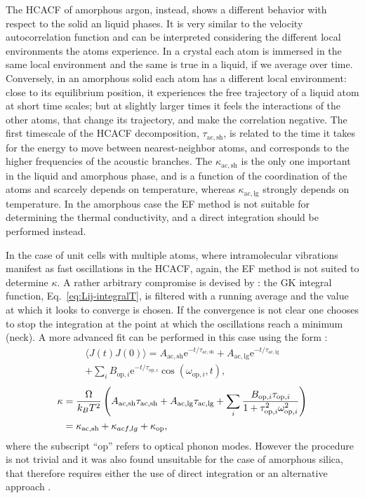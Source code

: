 \begin{LEtext}
The HCACF of amorphous argon, instead, shows a different behavior with respect to the solid an liquid phases. It is very similar to the velocity autocorrelation function and can be interpreted considering the different local environments the atoms experience. In a crystal each atom is immersed in the same local environment and the same is true in a liquid, if we average over time. Conversely, in an amorphous solid each atom has a different local environment: close to its equilibrium position, it experiences the free trajectory of a liquid atom at short time scales; but at slightly larger times it feels the interactions of the other atoms, that change its trajectory, and make the correlation negative. 
The first timescale of the HCACF decomposition, $\tau_{\mathrm{ac,sh}}$, is related to the time it takes for the energy to move between nearest-neighbor atoms, and corresponds to the higher frequencies of the acoustic branches. The $\kappa_{\mathrm{ac,sh}}$ is the only one important in the liquid and amorphous phase, and is a function of the coordination of the atoms and scarcely depends on temperature, whereas $\kappa_{\mathrm{ac,lg}}$ strongly depends on temperature.
In the amorphous case the EF method is not suitable for determining the thermal conductivity, and a direct integration should be performed instead. 

In the case of unit cells with multiple atoms, where intramolecular vibrations manifest as fast oscillations in the HCACF, again, the EF method is not suited to determine $\kappa$. A rather arbitrary compromise is devised by \citet{McGaughey2004b}: the GK integral function, Eq.~\eqref{eq:Lij-integralT}, is filtered with a running average \cite{MovingAverage} and the value at which it looks to converge is chosen. If the convergence is not clear one chooses to stop the integration at the point at which the oscillations reach a minimum (neck). A more advanced fit can be performed in this case using the form \cite{McGaughey2004b}:
\begin{multline}
    \langle J(t) J(0) \rangle = A_{\mathrm{ac,sh}} \mathrm{e}^{-t/\tau_{\mathrm{ac,sh}}} + A_{\mathrm{ac,lg}} \mathrm{e}^{-t/\tau_{\mathrm{ac,lg}}} \\
        + \sum_i B_{\mathrm{op},i} \mathrm{e}^{-t/\tau_{\mathrm{op},i}} \cos(\omega_{\mathrm{op},i},t),
\end{multline}
\begin{equation}
    \begin{aligned}
        \kappa &= \frac{{\mathrm\Omega}}{k_B T^2} \left(A_{\mathrm{ac,sh}}\tau_{\mathrm{ac,sh}} + A_{\mathrm{ac,lg}}\tau_{\mathrm{ac,lg}} + \sum_i \frac{B_{\mathrm{op},i}\tau_{\mathrm{op},i}}{1+\tau_{\mathrm{op},i}^2\omega_{\mathrm{op},i}^2}\right) \\
        &= \kappa_{\mathrm{ac,sh}} + \kappa_{acf,lg} + \kappa_{\mathrm{op}},
    \end{aligned}
\end{equation}
where the subscript ``$\mathrm{op}$'' refers to optical phonon modes. However the procedure is not trivial and it was also found unsuitable for the case of amorphous silica, that therefore requires either the use of direct integration or an alternative approach \cite{McGaughey2004b}.



\end{LEtext}
